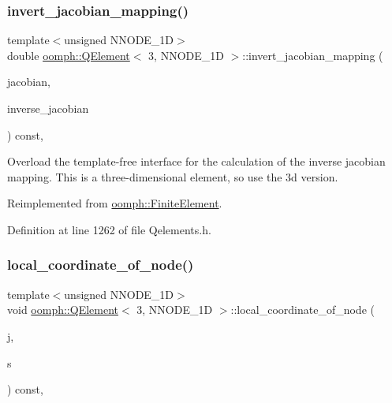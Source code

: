 \subsubsection{\texorpdfstring{invert\+\_\+jacobian\+\_\+mapping()}{invert\_jacobian\_mapping()}}
{\footnotesize\ttfamily template$<$unsigned N\+N\+O\+D\+E\+\_\+1D$>$ \\
double \hyperlink{classoomph_1_1QElement}{oomph\+::\+Q\+Element}$<$ 3, N\+N\+O\+D\+E\+\_\+1D $>$\+::invert\+\_\+jacobian\+\_\+mapping (\begin{DoxyParamCaption}\item[{const \hyperlink{classoomph_1_1DenseMatrix}{Dense\+Matrix}$<$ double $>$ \&}]{jacobian,  }\item[{\hyperlink{classoomph_1_1DenseMatrix}{Dense\+Matrix}$<$ double $>$ \&}]{inverse\+\_\+jacobian }\end{DoxyParamCaption}) const\hspace{0.3cm}{\ttfamily [inline]}, {\ttfamily [virtual]}}



Overload the template-\/free interface for the calculation of the inverse jacobian mapping. This is a three-\/dimensional element, so use the 3d version. 



Reimplemented from \hyperlink{classoomph_1_1FiniteElement_a42c86a7628fee00d3a9d35b935b29e48}{oomph\+::\+Finite\+Element}.



Definition at line 1262 of file Qelements.\+h.

\mbox{\label{classoomph_1_1QElement_3_013_00_01NNODE__1D_01_4_ae553b0a2f167d83dc7da8c57b82b5fdd}} 
\subsubsection{\texorpdfstring{local\+\_\+coordinate\+\_\+of\+\_\+node()}{local\_coordinate\_of\_node()}}
{\footnotesize\ttfamily template$<$unsigned N\+N\+O\+D\+E\+\_\+1D$>$ \\
void \hyperlink{classoomph_1_1QElement}{oomph\+::\+Q\+Element}$<$ 3, N\+N\+O\+D\+E\+\_\+1D $>$\+::local\+\_\+coordinate\+\_\+of\+\_\+node (\begin{DoxyParamCaption}\item[{const unsigned \&}]{j,  }\item[{\hyperlink{classoomph_1_1Vector}{Vector}$<$ double $>$ \&}]{s }\end{DoxyParamCaption}) const\hspace{0.3cm}{\ttfamily [inline]}, {\ttfamily [virtual]}}



